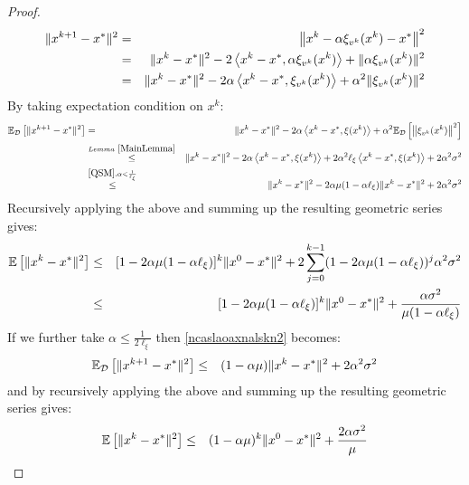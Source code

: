 \documentclass{article}
\begin{document}
\begin{proof}
\begin{eqnarray}
\|x^{k+1}-x^*\|^2 &=&\left\|x^k-\alpha \xi_{v^k}(x^k)-x^* \right\|^2\notag\\
&=&\|x^k-x^*\|^2-2 \left\langle x^k-x^*, \alpha \xi_{v^k}(x^k) \right\rangle  + \| \alpha \xi_{v^k}(x^k)\|^2\notag\\
&=&\|x^k-x^*\|^2-2 \alpha \left\langle x^k-x^*, \xi_{v^k}(x^k)\right\rangle  + \alpha^2 \| \xi_{v^k}(x^k)\|^2
\end{eqnarray}
By taking expectation condition on $x^k$:
\begin{eqnarray}
\label{ncaslaoaxnalskn2}
\mathbb{E}_{{\cal D}} \left[ \|x^{k+1}-x^*\|^2 \right]&=& \|x^k-x^*\|^2-2 \alpha \left\langle x^k-x^*, \xi(x^k)\right\rangle + \alpha^2  \mathbb{E}_{{\cal D}}  \left[ \left\|\xi_{v^k}(x^k) \right\|^2 \right] \notag\\
&\overset{Lemma~\ref{MainLemma}}{\leq}& \|x^k-x^*\|^2-2 \alpha \left\langle x^k-x^*, \xi(x^k)\right\rangle + 2 \alpha^2  \ell_{\xi}\left\langle x^k-x^*, \xi(x^k)\right\rangle  + 2  \alpha^2 \sigma^2 \notag\\
&\overset{\eqref{QSM}, \alpha < \frac{1}{\ell_\xi}}{\leq}& \|x^k-x^*\|^2-2\alpha \mu(1- \alpha \ell_\xi) \|x^k-x^*\|^2 + 2  \alpha^2 \sigma^2 
\end{eqnarray}
Recursively applying the above and summing up the resulting geometric series gives:
\begin{eqnarray}
\mathbb{E} \left[ \|x^{k}-x^*\|^2 \right]&\leq& [1-2\alpha \mu(1- \alpha \ell_\xi) ]^k \|x^0-x^*\|^2  + 2 \sum_{j=0}^{k-1} (1-2\alpha \mu(1- \alpha \ell_\xi))^j \alpha^2 \sigma^2\notag\\
&\leq & [1-2\alpha \mu(1- \alpha \ell_\xi) ]^k \|x^0-x^*\|^2  + \frac{  \alpha \sigma^2}{\mu(1- \alpha \ell_\xi) }
\end{eqnarray}
If we further take $\alpha \leq \frac{1}{2\ell_\xi}$ then \eqref{ncaslaoaxnalskn2} becomes:
\begin{eqnarray}
\label{ncaslaoaxnalskn3}
\mathbb{E}_{{\cal D}} \left[ \|x^{k+1}-x^*\|^2 \right]&\leq& (1-\alpha \mu) \|x^k-x^*\|^2+ 2  \alpha^2 \sigma^2 
\end{eqnarray}
and by recursively applying the above and summing up the resulting geometric series gives:
\begin{eqnarray}
\label{cnaskjdaooaskn}
\mathbb{E} \left[ \|x^{k}-x^*\|^2 \right]
&\leq & (1-\alpha \mu)^k \|x^0-x^*\|^2  + \frac{ 2 \alpha \sigma^2}{\mu }
\end{eqnarray}
\end{proof}
\end{document}
